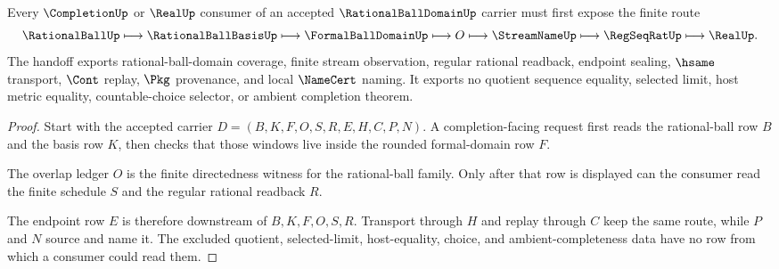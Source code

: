 \begin{theorem}\label{thm:rational-ball-domain-completion-handoff}
Every $\CompletionUp$ or $\RealUp$ consumer of an accepted $\RationalBallDomainUp$ carrier must first expose the finite route
$$
\RationalBallUp \longmapsto \RationalBallBasisUp \longmapsto \FormalBallDomainUp \longmapsto O \longmapsto \StreamNameUp \longmapsto \RegSeqRatUp \longmapsto \RealUp .
$$
The handoff exports rational-ball-domain coverage, finite stream observation, regular rational readback, endpoint sealing, $\hsame$ transport, $\Cont$ replay, $\Pkg$ provenance, and local $\NameCert$ naming. It exports no quotient sequence equality, selected limit, host metric equality, countable-choice selector, or ambient completion theorem.
\end{theorem}
\begin{proof}
Start with the accepted carrier $D=(B,K,F,O,S,R,E,H,C,P,N)$. A completion-facing request first reads the rational-ball row $B$ and the basis row $K$, then checks that those windows live inside the rounded formal-domain row $F$.

The overlap ledger $O$ is the finite directedness witness for the rational-ball family. Only after that row is displayed can the consumer read the finite schedule $S$ and the regular rational readback $R$.

The endpoint row $E$ is therefore downstream of $B,K,F,O,S,R$. Transport through $H$ and replay through $C$ keep the same route, while $P$ and $N$ source and name it. The excluded quotient, selected-limit, host-equality, choice, and ambient-completeness data have no row from which a consumer could read them.
\end{proof}



